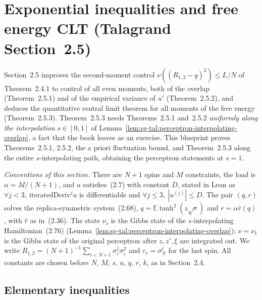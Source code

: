 \section{Exponential inequalities and free energy CLT (Talagrand Section~2.5)}\label{sec:sg-tal:perceptron-exponential-inequalities}

Section~2.5 improves the second-moment control $\nu((R_{1,2}-q)^2)\le L/N$ of Theorem~2.4.1 to control
of all even moments, both of the overlap (Theorem~2.5.1) and of the empirical variance of $u'$
(Theorem~2.5.2), and deduces the quantitative central limit theorem for all moments of the free energy
(Theorem~2.5.3). Theorem~2.5.3 needs Theorems~2.5.1 and~2.5.2 \emph{uniformly along the interpolation}
$s\in[0,1]$ of Lemma~\ref{lem:sg-tal:perceptron-interpolating-overlap}, a fact that the book leaves as
an exercise. This blueprint proves Theorems~2.5.1, 2.5.2, the a priori fluctuation bound, and
Theorem~2.5.3 along the entire $s$-interpolating path, obtaining the perceptron statements at $s=1$.

\emph{Conventions of this section.} There are $N+1$ spins and $M$ constraints, the load is
$\alpha=M/(N+1)$, and $u$ satisfies~(2.7) with constant $D$, stated in Lean as
$\forall j<3,\ \mathrm{iteratedDeriv}^{j}u$ is differentiable and $\forall j\le 3,\ |u^{(j)}|\le D$.
The pair $(q,r)$ solves the replica-symmetric system~(2.68), $q=\mathbb E\tanh^2(z\sqrt r)$ and
$r=\alpha\widehat r(q)$, with $\widehat r$ as in~(2.36). The state $\nu_s$ is the Gibbs state of the
$s$-interpolating Hamiltonian~(2.76) (Lemma~\ref{lem:sg-tal:perceptron-interpolating-overlap}); $\nu=\nu_1$ is
the Gibbs state of the original perceptron after $z,z',\xi$ are integrated out. We write
$R_{1,2}=(N+1)^{-1}\sum_{i<N+1}\sigma^1_i\sigma^2_i$ and $\varepsilon_\ell=\sigma^\ell_N$ for the last spin.
All constants are chosen before $N$, $M$, $s$, $u$, $q$, $r$, $k$, as in Section~2.4.

\subsection{Elementary inequalities}\label{sub:sg-tal:perceptron-exponential-elementary}

